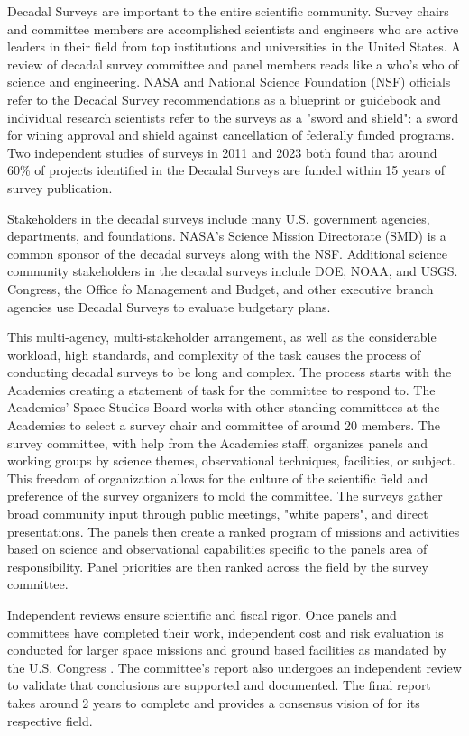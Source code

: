\documentclass[preprint,12pt]{elsarticle}
\begin{document}
Decadal Surveys are important to the entire scientific community. Survey chairs and committee members are accomplished scientists and engineers who are active leaders in their field from top institutions and universities in the United States. A review of decadal survey committee and panel members reads like a who's who of science and engineering. NASA and National Science Foundation (NSF) officials refer to the Decadal Survey recommendations as a blueprint or guidebook and individual research scientists refer to the surveys as a "sword and shield": a sword for wining approval and shield against cancellation of federally funded programs. Two independent studies of surveys in 2011 \cite{Trimble2011} and 2023 \cite{pan2023seven_decadals} both found that around 60\% of projects identified in the Decadal Surveys are funded within 15 years of survey publication. 

Stakeholders in the decadal surveys include many U.S. government agencies, departments, and foundations. NASA's Science Mission Directorate (SMD) is a common sponsor of the decadal surveys along with the NSF. Additional science community stakeholders in the decadal surveys include DOE, NOAA, and USGS. Congress, the Office fo Management and Budget, and other executive branch agencies use Decadal Surveys to evaluate budgetary plans.

This multi-agency, multi-stakeholder arrangement, as well as the considerable workload, high standards, and complexity of the task causes the process of conducting decadal surveys to be long and complex. The process starts with the Academies creating a statement of task for the committee to respond to. The Academies' Space Studies Board works with other standing committees at the Academies to select a survey chair and committee of around 20 members. The survey committee, with help from the Academies staff, organizes panels and working groups by science themes, observational techniques, facilities, or subject. This freedom of organization allows for the culture of the scientific field and preference of the survey organizers to mold the committee. The surveys gather broad community input through public meetings, "white papers", and direct presentations. The panels then create a ranked program of missions and activities based on science and observational capabilities specific to the panels area of responsibility. Panel priorities are then ranked across the field by the survey committee. 

Independent reviews ensure scientific and fiscal rigor. Once panels and committees have completed their work, independent cost and risk evaluation is conducted for larger space missions and ground based facilities as mandated by the U.S. Congress \cite{congress2008NASA}. The committee's report also undergoes an independent review to validate that conclusions are supported and documented. The final report takes around 2 years to complete and provides a consensus vision of for its respective field.
\end{document}
